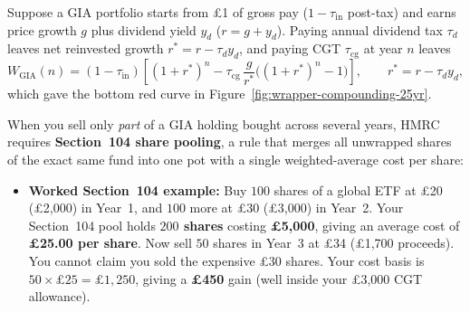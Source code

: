 Suppose a GIA portfolio starts from \pounds 1 of gross pay ($1 - \tau_{\text{in}}$ post-tax) and earns price growth $g$ plus dividend yield $y_d$ ($r = g + y_d$). Paying annual dividend tax $\tau_d$ leaves net reinvested growth $r^* = r - \tau_d y_d$, and paying CGT $\tau_{\text{cg}}$ at year $n$ leaves
\begin{equation}
  W_{\text{GIA}}(n) = (1 - \tau_{\text{in}})\left[(1 + r^*)^n - \tau_{\text{cg}}\,\frac{g}{r^*}\bigl((1 + r^*)^n - 1\bigr)\right], \qquad r^* = r - \tau_d y_d,
  \label{eq:wealth-gia}
\end{equation}
which gave the bottom red curve in Figure~\ref{fig:wrapper-compounding-25yr}.

When you sell only \emph{part} of a GIA holding bought across several years, HMRC requires \textbf{Section~104 share pooling}, a rule that merges all unwrapped shares of the exact same fund into one pot with a single weighted-average cost per share:
\begin{itemize}
  \item \textbf{Worked Section~104 example:} Buy $100$ shares of a global ETF at \pounds 20 (\pounds 2,000) in Year~1, and $100$ more at \pounds 30 (\pounds 3,000) in Year~2. Your Section~104 pool holds \textbf{$200$ shares} costing \textbf{\pounds 5,000}, giving an average cost of \textbf{\pounds 25.00 per share}. Now sell $50$ shares in Year~3 at \pounds 34 (\pounds 1,700 proceeds). You cannot claim you sold the expensive \pounds 30 shares. Your cost basis is $50 \times \pounds 25 = \pounds 1{,}250$, giving a \textbf{\pounds 450} gain (well inside your \pounds 3,000 CGT allowance).
\end{itemize}


